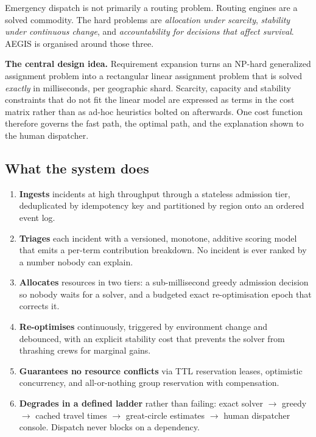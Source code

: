 \documentclass[11pt,a4paper]{article}
\begin{document}
Emergency dispatch is not primarily a routing problem. Routing engines are a
solved commodity. The hard problems are \emph{allocation under scarcity},
\emph{stability under continuous change}, and \emph{accountability for
decisions that affect survival}. AEGIS is organised around those three.

\begin{keybox}
\textbf{The central design idea.} Requirement expansion turns an
NP-hard generalized assignment problem into a rectangular linear assignment
problem that is solved \emph{exactly} in milliseconds, per geographic shard.
Scarcity, capacity and stability constraints that do not fit the linear model
are expressed as terms in the cost matrix rather than as ad-hoc heuristics
bolted on afterwards. One cost function therefore governs the fast path, the
optimal path, and the explanation shown to the human dispatcher.
\end{keybox}

\subsection*{What the system does}

\begin{enumerate}
\item \textbf{Ingests} incidents at high throughput through a stateless
      admission tier, deduplicated by idempotency key and partitioned by
      region onto an ordered event log.
\item \textbf{Triages} each incident with a versioned, monotone, additive
      scoring model that emits a per-term contribution breakdown. No incident
      is ever ranked by a number nobody can explain.
\item \textbf{Allocates} resources in two tiers: a sub-millisecond greedy
      admission decision so nobody waits for a solver, and a budgeted exact
      re-optimisation epoch that corrects it.
\item \textbf{Re-optimises} continuously, triggered by environment change and
      debounced, with an explicit stability cost that prevents the solver from
      thrashing crews for marginal gains.
\item \textbf{Guarantees no resource conflicts} via TTL reservation leases,
      optimistic concurrency, and all-or-nothing group reservation with
      compensation.
\item \textbf{Degrades in a defined ladder} rather than failing: exact solver
      $\rightarrow$ greedy $\rightarrow$ cached travel times $\rightarrow$
      great-circle estimates $\rightarrow$ human dispatcher console. Dispatch
      never blocks on a dependency.
\end{enumerate}
\end{document}
